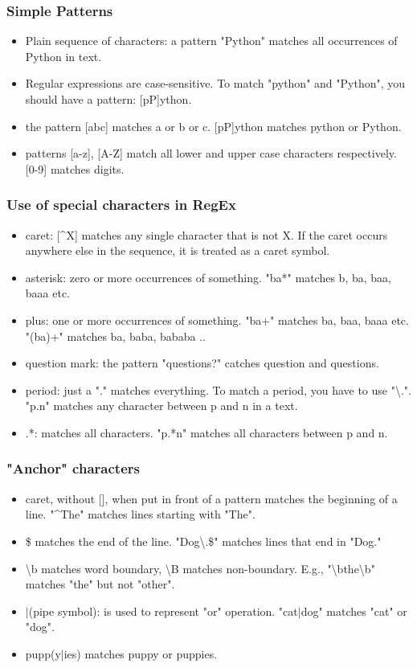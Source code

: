 \documentclass{beamer}
\begin{document}
\begin{frame}
\frametitle{Simple Patterns}
\begin{itemize}
\item Plain sequence of characters: a pattern "Python" matches all occurrences of Python in text.
\item Regular expressions are case-sensitive. To match "python" and "Python", you should have a pattern: [pP]ython.
\item the pattern [abc] matches a or b or c. [pP]ython matches python or Python.
\item patterns [a-z], [A-Z] match all lower and upper case characters respectively. [0-9] matches digits.
\end{itemize}
\end{frame}

\begin{frame}
\frametitle{Use of special characters in RegEx}
\begin{itemize}
\item caret: [\^{}X] matches any single character that is not X. If the caret occurs anywhere else in the sequence, it is treated as a caret symbol.
\item asterisk: zero or more occurrences of something. "ba*" matches b, ba, baa, baaa etc.
\item plus: one or more occurrences of something. "ba+" matches ba, baa, baaa etc. "(ba)+" matches ba, baba, bababa .. 
\item question mark: the pattern "questions?" catches question and questions. 
\item period: just a "." matches everything. To match a period, you have to use "\textbackslash.". "p.n" matches any character between p and n in a text.
\item .*: matches all characters. "p.*n" matches all characters between p and n.
\end{itemize}
\end{frame}

\begin{frame}
\frametitle{"Anchor" characters}
\begin{itemize}
\item caret, without [], when put in front of a pattern matches the beginning of a line. "\^{}The" matches lines starting with "The".
\item \$ matches the end of the line. "Dog\textbackslash.\$" matches lines that end in "Dog."
\item \textbackslash b matches word boundary, \textbackslash B matches non-boundary. E.g., "\textbackslash bthe\textbackslash b" matches "the" but not "other". 
\item $|$(pipe symbol): is used to represent "or" operation. "cat$|$dog" matches "cat" or "dog".
\item pupp(y$|$ies) matches puppy or puppies.
\end{itemize}
\end{frame}
\end{document}
